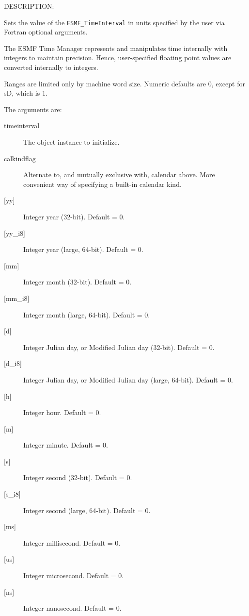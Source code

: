 {\sf DESCRIPTION:\\ }


       Sets the value of the {\tt ESMF\_TimeInterval} in units specified by
       the user via Fortran optional arguments.
  
       The ESMF Time Manager represents and manipulates time internally with
       integers to maintain precision.  Hence, user-specified floating point
       values are converted internally to integers.
  
       Ranges are limited only by machine word size.  Numeric defaults are 0,
       except for sD, which is 1.
  
       The arguments are:
       \begin{description}
       \item[timeinterval]
            The object instance to initialize.
       \item[calkindflag]
            Alternate to, and mutually exclusive with, 
            calendar above.  More convenient way of specifying a built-in 
            calendar kind.
       \item[{[yy]}]
            Integer year (32-bit).  Default = 0.
       \item[{[yy\_i8]}]
            Integer year (large, 64-bit).  Default = 0.
       \item[{[mm]}]
            Integer month (32-bit).  Default = 0.
       \item[{[mm\_i8]}]
            Integer month (large, 64-bit).  Default = 0.
       \item[{[d]}]
            Integer Julian day, or Modified Julian day (32-bit).  Default = 0.
       \item[{[d\_i8]}]
            Integer Julian day, or Modified Julian day (large, 64-bit).
            Default = 0.
       \item[{[h]}]
            Integer hour.  Default = 0.
       \item[{[m]}]
            Integer minute.  Default = 0.
       \item[{[s]}]
            Integer second (32-bit).  Default = 0.
       \item[{[s\_i8]}]
            Integer second (large, 64-bit).  Default = 0.
       \item[{[ms]}]
            Integer millisecond.  Default = 0.
       \item[{[us]}]
            Integer microsecond.  Default = 0.
       \item[{[ns]}]
            Integer nanosecond.  Default = 0.

\end{description}
